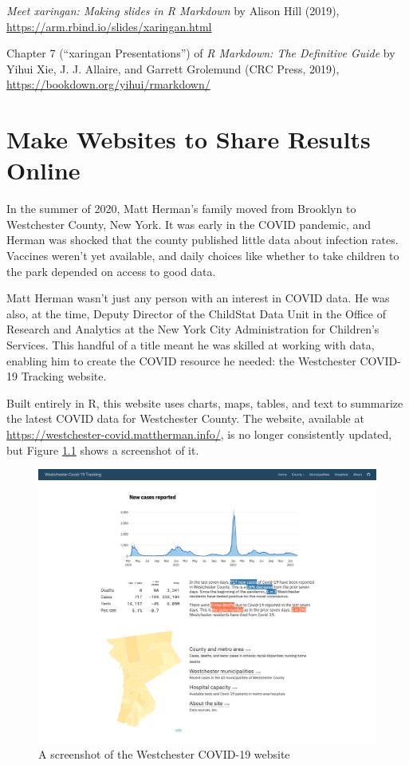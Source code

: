 \documentclass[
]{book}
\begin{document}
\emph{Meet xaringan: Making slides in R Markdown} by Alison Hill (2019), \url{https://arm.rbind.io/slides/xaringan.html}

Chapter 7 (``xaringan Presentations'') of \emph{R Markdown: The Definitive Guide} by Yihui Xie, J. J. Allaire, and Garrett Grolemund (CRC Press, 2019), \url{https://bookdown.org/yihui/rmarkdown/}

\hypertarget{websites-chapter}{%
\chapter{Make Websites to Share Results Online}\label{websites-chapter}}

In the summer of 2020, Matt Herman's family moved from Brooklyn to Westchester County, New York. It was early in the COVID pandemic, and Herman was shocked that the county published little data about infection rates. Vaccines weren't yet available, and daily choices like whether to take children to the park depended on access to good data.

Matt Herman wasn't just any person with an interest in COVID data. He was also, at the time, Deputy Director of the ChildStat Data Unit in the Office of Research and Analytics at the New York City Administration for Children's Services. This handful of a title meant he was skilled at working with data, enabling him to create the COVID resource he needed: the Westchester COVID-19 Tracking website.

Built entirely in R, this website uses charts, maps, tables, and text to summarize the latest COVID data for Westchester County. The website, available at \url{https://westchester-covid.mattherman.info/}, is no longer consistently updated, but Figure \ref{fig:westchester-website-screenshot} shows a screenshot of it.

\begin{figure}
\includegraphics[width=1\linewidth]{assets/westchester-website} \caption{A screenshot of the Westchester COVID-19 website}\label{fig:westchester-website-screenshot}
\end{figure}
\end{document}
